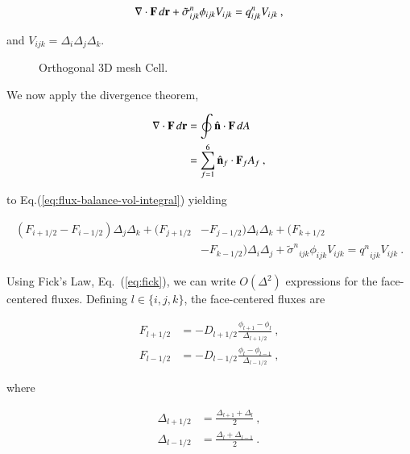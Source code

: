 \documentclass[preprint,12pt]{elsarticle}
\newcommand{\sign}{\ensuremath{\tilde{\sigma}^n}}
\newcommand{\qn}{\ensuremath{q^n}}
\newcommand{\Di}{\ensuremath{\Delta_i}}
\newcommand{\Dj}{\ensuremath{\Delta_j}}
\newcommand{\Dk}{\ensuremath{\Delta_k}}
\begin{document}
\begin{equation}
  \iiint\dive{F}\,d\ve{r} +
  \sign_{ijk}\phi_{ijk}V_{ijk}=\qn_{ijk}V_{ijk}\:,
  \label{eq:flux-balance-vol-integral}
\end{equation}

and $V_{ijk} = \Delta_i\Delta_j\Delta_k$.  

\begin{figure}[htpb!]
  \centerline{
    }
  \caption{Orthogonal 3D mesh Cell.}
  \label{fig:cell}
\end{figure}

We now apply the divergence theorem,

\begin{equation}
  \begin{split}
    \relax\nabla\cdot\mathbf{F}\,d\mathbf{r} &= \oint\hat{\mathbf{n}}\cdot\mathbf{F}\,dA\\
    &= \sum_{f=1}^{6}\hat{\mathbf{n}}_f\cdot\mathbf{F}_f A_f\:,
  \end{split}
\end{equation}

to Eq.(\ref{eq:flux-balance-vol-integral}) yielding

\begin{equation}
  \begin{split}
    (F_{i+1/2} - F_{i-1/2})\Dj\Dk + (F_{j+1/2} &- F_{j-1/2})\Di\Dk +
    (F_{k+1/2}\\ &- F_{k-1/2})\Di\Dj + \sign_{ijk}\phi_{ijk}V_{ijk} =
    \qn_{ijk}V_{ijk}\:.
  \end{split}
  \label{eq:flux-balance-difference}
\end{equation}

Using Fick's Law, Eq.~(\ref{eq:fick}), we can write $O(\Delta^2)$
expressions for the face-centered fluxes.  Defining $l\in\{i,j,k\}$,
the face-centered fluxes are

\begin{align}
  F_{l+1/2} &= -D_{l+1/2}\frac{\phi_{l+1} -
    \phi_{l}}{\Delta_{l+1/2}}\:, \label{eq:F_l+1/2}\\
  F_{l-1/2} &= -D_{l-1/2}\frac{\phi_{l} -
    \phi_{l-1}}{\Delta_{l-1/2}}\:, \label{eq:F_l-1/2}
\end{align}

where

\begin{align}
  \Delta_{l+1/2} &= \frac{\Delta_{l+1} + \Delta_{l}}{2}\:,\\
  \Delta_{l-1/2} &= \frac{\Delta_{l} + \Delta_{l-1}}{2}\:.
\end{align}
\end{document}

